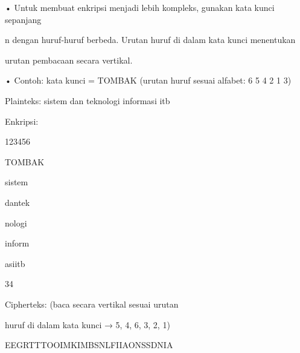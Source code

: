 \documentclass{article}
\begin{document}

• Untuk membuat enkripsi menjadi lebih kompleks, gunakan kata kunci sepanjang 

n dengan huruf-huruf berbeda. Urutan huruf di dalam kata kunci menentukan 

urutan pembacaan secara vertikal.

• Contoh: kata kunci = TOMBAK    (urutan huruf sesuai alfabet: 6  5  4  2  1  3)   

 Plainteks: sistem dan teknologi informasi itb

   Enkripsi:   

             123456   

             TOMBAK


sistem


dantek


nologi


inform


asiitb

34

Cipherteks: (baca secara vertikal sesuai urutan 

huruf di dalam kata kunci → 5, 4, 6, 3, 2, 1)

EEGRTTTOOIMKIMBSNLFIIAONSSDNIA
\end{document}
